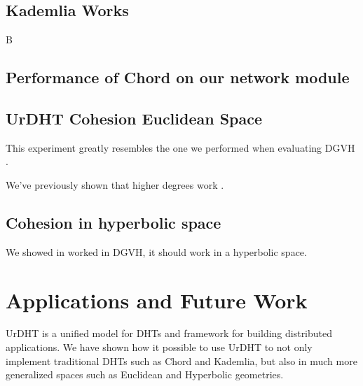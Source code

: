 \documentclass[11pt,conference]{IEEEtran}
\begin{document}
\subsection{Kademlia Works}
B


\subsection{Performance of Chord on our network module}



\subsection{UrDHT Cohesion Euclidean Space}
This experiment greatly resembles the one we performed when evaluating DGVH \cite{dgvh}.

We've previously shown that higher degrees work \cite{dgvh}.

\subsection{Cohesion in hyperbolic space}
We showed in worked in DGVH, it should work in a hyperbolic space.




%


\section{Applications and Future Work}
\label{sec:future}

UrDHT is a unified model for DHTs and framework for building distributed applications.
We have shown how it possible to use UrDHT to not only implement traditional DHTs such as Chord and Kademlia, but also in much more generalized spaces such as Euclidean and Hyperbolic geometries.
\end{document}
